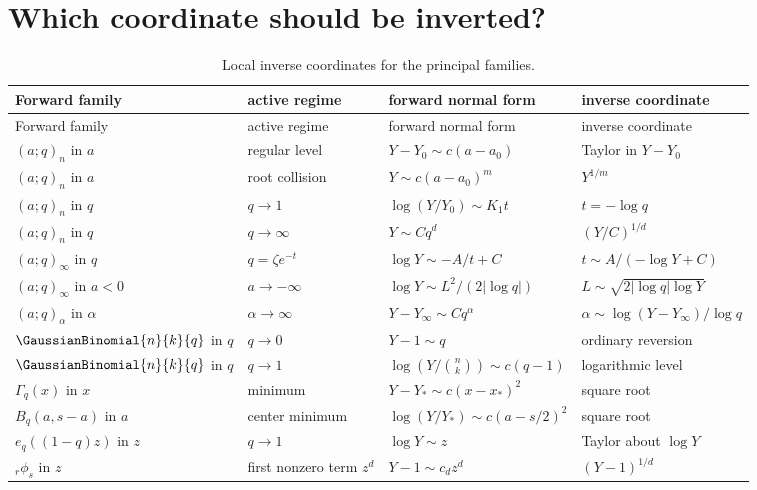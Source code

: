 \documentclass[11pt,a4paper,oneside,openany]{book}
\theoremstyle{definition}
\theoremstyle{remark}
\begin{document}
\section{Which coordinate should be inverted?}

\begin{longtable}{@{}p{}p{}p{}p{}@{}}
\caption{Local inverse coordinates for the principal families.\label{tab:coordinate-atlas}}\\
\toprule
Forward family & active regime & forward normal form & inverse coordinate\\
\midrule
\endfirsthead
\toprule
Forward family & active regime & forward normal form & inverse coordinate\\
\midrule
\endhead
\((a;q)_n\) in \(a\) & regular level & \(Y-Y_0\sim c(a-a_0)\) & Taylor in \(Y-Y_0\)\\
\((a;q)_n\) in \(a\) & root collision & \(Y\sim c(a-a_0)^m\) & \(Y^{1/m}\)\\
\((a;q)_n\) in \(q\) & \(q\to1\) & \(\log(Y/Y_0)\sim K_1t\) & \(t=-\log q\)\\
\((a;q)_n\) in \(q\) & \(q\to\infty\) & \(Y\sim Cq^d\) & \((Y/C)^{1/d}\)\\
\((a;q)_\infty\) in \(q\) & \(q=\zeta e^{-t}\) & \(\log Y\sim-A/t+C\) & \(t\sim A/(-\log Y+C)\)\\
\((a;q)_\infty\) in \(a<0\) & \(a\to-\infty\) & \(\log Y\sim L^2/(2|\log q|)\) & \(L\sim\sqrt{2|\log q|\log Y}\)\\
\((a;q)_\alpha\) in \(\alpha\) & \(\alpha\to\infty\) & \(Y-Y_\infty\sim Cq^\alpha\) & \(\alpha\sim\log(Y-Y_\infty)/\log q\)\\
\(\GaussianBinomial{n}{k}{q}\) in \(q\) & \(q\to0\) & \(Y-1\sim q\) & ordinary reversion\\
\(\GaussianBinomial{n}{k}{q}\) in \(q\) & \(q\to1\) & \(\log(Y/\binom nk)\sim c(q-1)\) & logarithmic level\\
\(\Gamma_q(x)\) in \(x\) & minimum & \(Y-Y_*\sim c(x-x_*)^2\) & square root\\
\(B_q(a,s-a)\) in \(a\) & center minimum & \(\log(Y/Y_*)\sim c(a-s/2)^2\) & square root\\
\(e_q((1-q)z)\) in \(z\) & \(q\to1\) & \(\log Y\sim z\) & Taylor about \(\log Y\)\\
\({}_r\phi_s\) in \(z\) & first nonzero term \(z^d\) & \(Y-1\sim c_dz^d\) & \((Y-1)^{1/d}\)\\
\bottomrule
\end{longtable}
\end{document}
